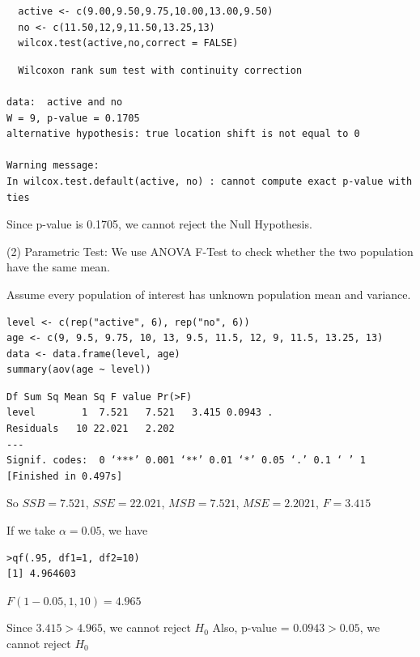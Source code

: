 \documentclass[letterpaper,11pt]{article}
\begin{document}
\begin{lstlisting}
  active <- c(9.00,9.50,9.75,10.00,13.00,9.50)
  no <- c(11.50,12,9,11.50,13.25,13)
  wilcox.test(active,no,correct = FALSE)
\end{lstlisting}

\begin{lstlisting}
  Wilcoxon rank sum test with continuity correction

data:  active and no
W = 9, p-value = 0.1705
alternative hypothesis: true location shift is not equal to 0

Warning message:
In wilcox.test.default(active, no) : cannot compute exact p-value with ties
\end{lstlisting}
\bigbreak

Since p-value is 0.1705, we cannot reject the Null Hypothesis.
\bigbreak

(2) Parametric Test: 
We use ANOVA F-Test to check whether the two population have the same mean.\par
Assume every population of interest has unknown population mean and variance.

\begin{lstlisting}
level <- c(rep("active", 6), rep("no", 6))
age <- c(9, 9.5, 9.75, 10, 13, 9.5, 11.5, 12, 9, 11.5, 13.25, 13)
data <- data.frame(level, age)
summary(aov(age ~ level))
\end{lstlisting}

\begin{lstlisting}
Df Sum Sq Mean Sq F value Pr(>F)
level        1  7.521   7.521   3.415 0.0943 .
Residuals   10 22.021   2.202
---
Signif. codes:  0 ‘***’ 0.001 ‘**’ 0.01 ‘*’ 0.05 ‘.’ 0.1 ‘ ’ 1
[Finished in 0.497s]
\end{lstlisting}

So $SSB = 7.521$, $SSE = 22.021$,
$MSB = 7.521$, $MSE = 2.2021$, $F=3.415$

If we take $\alpha = 0.05$, we have


\begin{lstlisting}
>qf(.95, df1=1, df2=10)
[1] 4.964603
\end{lstlisting}

$F(1-0.05,1,10) = 4.965$

Since $3.415>4.965$, we cannot reject $H_0$
\bigbreak
Also, p-value = $0.0943>0.05$, we cannot reject $H_0$
\end{document}
